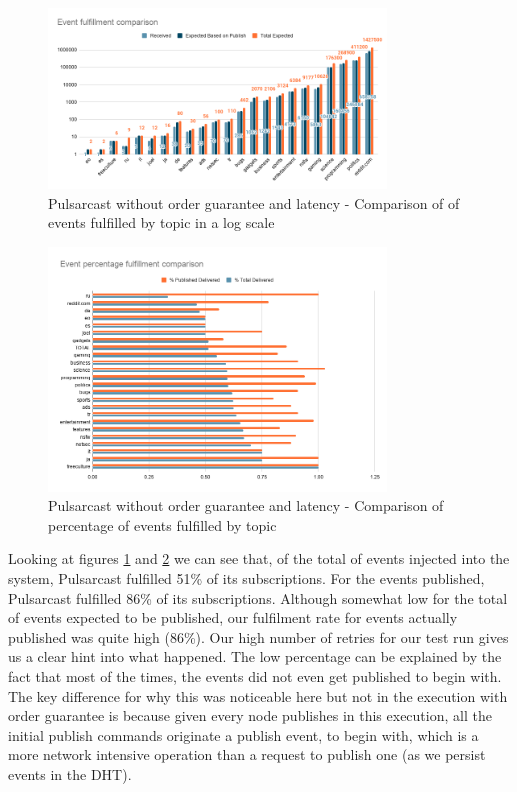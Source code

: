 \begin{figure}[!htb]
  \centering
  \includegraphics[width=0.8\textwidth]{img/graph-pulsarcast-latency-event-fulfillment-comparison.png}
  \caption{Pulsarcast without order guarantee and latency - Comparison of of events fulfilled by topic in a log scale}
  \label{fig:graph-pulsarcast-latency-event-fulfillment-comparison}
\end{figure}

\begin{figure}[!htb]
  \centering
  \includegraphics[width=0.8\textwidth]{img/graph-pulsarcast-latency-event-percentage-fulfillment-comparison.png}
  \caption{Pulsarcast without order guarantee and latency - Comparison of percentage of events fulfilled by topic}
  \label{fig:graph-pulsarcast-latency-event-percentage-fulfillment-comparison}
\end{figure}

Looking at figures
\ref{fig:graph-pulsarcast-latency-event-fulfillment-comparison} and
\ref{fig:graph-pulsarcast-latency-event-percentage-fulfillment-comparison} we
can see that, of the total of events injected into the system, Pulsarcast
fulfilled 51\% of its subscriptions. For the  events published, Pulsarcast
fulfilled 86\% of its subscriptions. Although somewhat low for the total of
events expected to be published, our fulfilment rate for events actually
published was quite high (86\%). Our high number of retries for our test run
gives us a clear hint into what happened. The low percentage can be explained
by the fact that most of the times, the events did not even get published to
begin with. The key difference for why this was noticeable here but not in the
execution with order guarantee is because given every node publishes in this
execution, all the initial publish commands originate a publish event, to begin
with, which is a more network intensive operation than a request to publish one
(as we persist events in the DHT).

